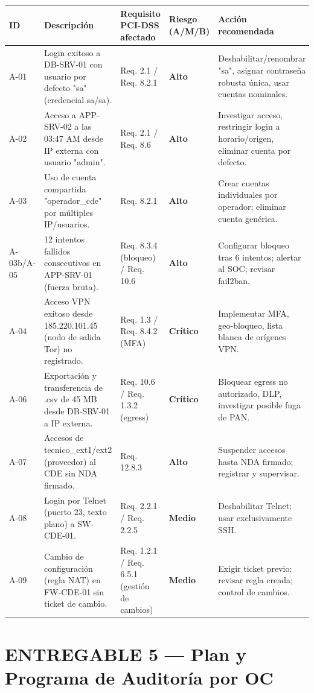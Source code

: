 \documentclass[11pt,a4paper]{article}
\begin{document}
\begin{tabularx}{\textwidth}{P{2cm}P{2.5cm}P{2.5cm}P{2cm}L}
\toprule
\textbf{ID} & \textbf{Descripción} & \textbf{Requisito PCI-DSS afectado} & \textbf{Riesgo (A/M/B)} & \textbf{Acción recomendada} \\
\midrule
A-01 & Login exitoso a DB-SRV-01 con usuario por defecto "sa" (credencial sa/sa). & Req. 2.1 / Req. 8.2.1 & \textbf{Alto} & Deshabilitar/renombrar "sa", asignar contraseña robusta única, usar cuentas nominales. \\
A-02 & Acceso a APP-SRV-02 a las 03:47 AM desde IP externa con usuario "admin". & Req. 2.1 / Req. 8.6 & \textbf{Alto} & Investigar acceso, restringir login a horario/origen, eliminar cuenta por defecto. \\
A-03 & Uso de cuenta compartida "operador_cde" por múltiples IP/usuarios. & Req. 8.2.1 & \textbf{Alto} & Crear cuentas individuales por operador; eliminar cuenta genérica. \\
A-03b/A-05 & 12 intentos fallidos consecutivos en APP-SRV-01 (fuerza bruta). & Req. 8.3.4 (bloqueo) / Req. 10.6 & \textbf{Alto} & Configurar bloqueo tras 6 intentos; alertar al SOC; revisar fail2ban. \\
A-04 & Acceso VPN exitoso desde 185.220.101.45 (nodo de salida Tor) no registrado. & Req. 1.3 / Req. 8.4.2 (MFA) & \textbf{Crítico} & Implementar MFA, geo-bloqueo, lista blanca de orígenes VPN. \\
A-06 & Exportación y transferencia de .csv de 45 MB desde DB-SRV-01 a IP externa. & Req. 10.6 / Req. 1.3.2 (egress) & \textbf{Crítico} & Bloquear egress no autorizado, DLP, investigar posible fuga de PAN. \\
A-07 & Accesos de tecnico_ext1/ext2 (proveedor) al CDE sin NDA firmado. & Req. 12.8.3 & \textbf{Alto} & Suspender accesos hasta NDA firmado; registrar y supervisar. \\
A-08 & Login por Telnet (puerto 23, texto plano) a SW-CDE-01. & Req. 2.2.1 / Req. 2.2.5 & \textbf{Medio} & Deshabilitar Telnet; usar exclusivamente SSH. \\
A-09 & Cambio de configuración (regla NAT) en FW-CDE-01 sin ticket de cambio. & Req. 1.2.1 / Req. 6.5.1 (gestión de cambios) & \textbf{Medio} & Exigir ticket previo; revisar regla creada; control de cambios. \\
\bottomrule
\end{tabularx}

\clearpage

\section{ENTREGABLE 5 — Plan y Programa de Auditoría por OC}
\end{document}
